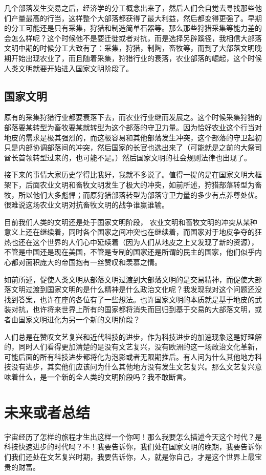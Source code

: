 \documentclass[11pt,oneside]{article}
\begin{document}
几个部落发生交易之后，经济学的分工概念出来了，然后人们会自觉去寻找那些他们产量最高的行当，这样整个大部落都获得了最大利益，然后都变得更强了。早期的分工可能还是只有采集，狩猎和制造简单石器等。那么那些狩猎采集等能力差的会怎么样呢？这个时候他不是要迁徙或者对抗，而是选择另辟蹊径，我相信大部落文明中期的时候分工大致有了：采集，狩猎，制陶，畜牧等，而到了大部落文明晚期开始出现农业了，而且随着采集，狩猎行业的衰落，农业部落的崛起，这个时候人类文明就要开始进入国家文明阶段了。

\subsection{国家文明}
\label{sec-7-3}
原有的采集狩猎行业都要衰落下去，而农业行业继而发展之。这个时候采集狩猎的部落要某转型为畜牧要某就转型为这个部落的守卫力量。因为恰好农业这个行当对地皮的需求是极其强烈的，而这极容易和其他部落发生冲突，这个部落的守卫起初只是内部协调部落间的冲突，然后国家的长官也选出来了（可能就是之前的大祭司酋长首领转型过来的，也可能不是。）然后国家文明的社会规则法律也出现了。

接下来的事情大家历史学得比我好，我就不多说了。值得一提的是在国家文明大框架下，后面农业文明和畜牧文明发生了极大的冲突，如前所述，狩猎部落转型为畜牧，所以他们大多彪悍；而原狩猎部落转型为部落守卫力量的多少有点养尊处优。很难说这场农业文明对抗畜牧文明的战争谁赢谁输。

目前我们人类的文明还是处于国家文明阶段， 农业文明和畜牧文明的冲突从某种意义上还在继续着，同时各个国家之间冲突也在继续着，而国家对于地皮争夺的狂热也还在这个世界的人们心中延续着（因为人们从地皮之上又发现了新的资源），不管是中国还是现在美国，不管是专制的国家还是所谓的民主的国家，他们似乎内心都对面积庞大的帝国抱有一丝赞叹和羡慕之情。

如前所述，促使人类文明从部落文明过渡到大部落文明的是交易精神，而促使大部落文明过渡到国家文明的是什么精神是什么政治文化呢？我发现我对这个问题还没找到答案，也许在座的各位有了一些想法。也许国家文明的本质就是基于地皮的武装对抗，也许将来世界上所有的国家都将消失而回归到基于交易的大部落文明，或者由国家文明进化为另一个新的文明阶段？

人们总是在赞叹文艺复兴和近代科技的进步，作为科技进步的加速现象这是好理解的，同时人们看得更加清楚的是没有文艺复兴，没有欧洲的这一场政治文化革新，可能后面的所有科技进步都将化为泡影或者无限期推后。有人问为什么其他地方科技没有进步，其实他们应该问为什么其他地方没有发生文艺复兴。那么文艺复兴意味着什么，是一个新的全人类的文明阶段吗？我不敢断言。



\section{未来或者总结}
\label{sec-8}
宇宙经历了怎样的旅程才生出这样一个你呵！那么我要怎么描述今天这个时代？是科技快速进步的时代吗？不！我要告诉你，我们处在国家文明的晚期，我要告诉你们我们还处在文艺复兴时期，我要告诉你，人，就是你自己，才是这个世界上最宝贵的财富。
\end{document}
